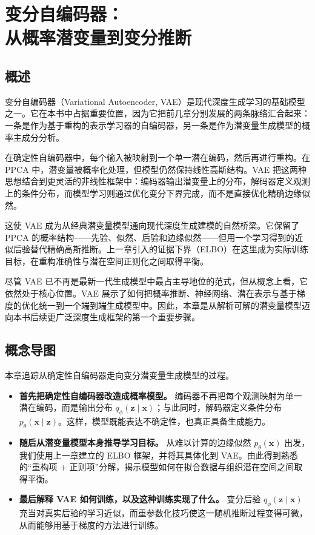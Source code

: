 \chapter[变分自编码器：从概率潜变量到变分推断]{变分自编码器：\\从概率潜变量到变分推断}

\section*{概述}

变分自编码器（Variational Autoencoder, VAE）是现代深度生成学习的基础模型之一。它在本书中占据重要位置，因为它把前几章分别发展的两条脉络汇合起来：一条是作为基于重构的表示学习器的自编码器，另一条是作为潜变量生成模型的概率主成分分析。

在确定性自编码器中，每个输入被映射到一个单一潜在编码，然后再进行重构。在 PPCA 中，潜变量被概率化处理，但模型仍然保持线性高斯结构。VAE 把这两种思想结合到更灵活的非线性框架中：编码器输出潜变量上的分布，解码器定义观测上的条件分布，而模型学习则通过优化变分下界完成，而不是直接优化精确边缘似然。

这使 VAE 成为从经典潜变量模型通向现代深度生成建模的自然桥梁。它保留了 PPCA 的概率结构——先验、似然、后验和边缘似然——但用一个学习得到的近似后验替代精确高斯推断。上一章引入的证据下界（ELBO）在这里成为实际训练目标，在重构准确性与潜在空间正则化之间取得平衡。

尽管 VAE 已不再是最新一代生成模型中最占主导地位的范式，但从概念上看，它依然处于核心位置。VAE 展示了如何把概率推断、神经网络、潜在表示与基于梯度的优化统一到一个端到端生成模型中。因此，本章是从解析可解的潜变量模型迈向本书后续更广泛深度生成框架的第一个重要步骤。

\section*{概念导图}

本章追踪从确定性自编码器走向变分潜变量生成模型的过程。

\begin{itemize}

    \item[\(\rightarrow\)] \textbf{首先把确定性自编码器改造成概率模型。}  
    编码器不再把每个观测映射为单一潜在编码，而是输出分布 \(q_{\phi}(\mathbf{z}\mid\mathbf{x})\)；与此同时，解码器定义条件分布 \(p_{\theta}(\mathbf{x}\mid\mathbf{z})\)。这样，模型既能表达不确定性，也真正具备生成能力。

    \item[\(\rightarrow\)] \textbf{随后从潜变量模型本身推导学习目标。}  
    从难以计算的边缘似然 \(p_{\theta}(\mathbf{x})\) 出发，我们使用上一章建立的 ELBO 框架，并将其具体化到 VAE。由此得到熟悉的“重构项 + 正则项”分解，揭示模型如何在拟合数据与组织潜在空间之间取得平衡。

    \item[\(\rightarrow\)] \textbf{最后解释 VAE 如何训练，以及这种训练实现了什么。}  
    变分后验 \(q_{\phi}(\mathbf{z}\mid\mathbf{x})\) 充当对真实后验的学习近似，而重参数化技巧使这一随机推断过程变得可微，从而能够用基于梯度的方法进行训练。

\end{itemize}

